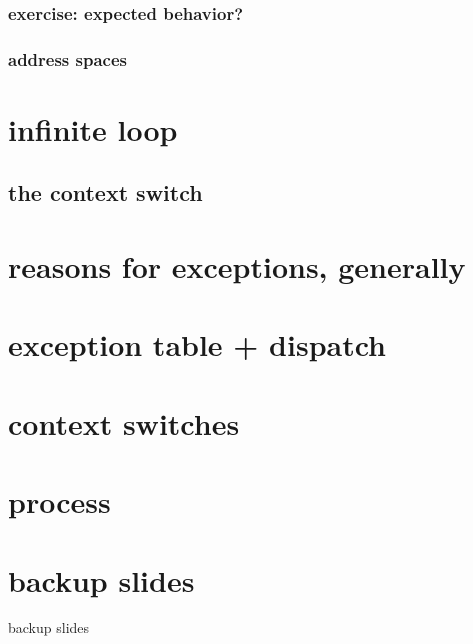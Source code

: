 \subsubsection{exercise: expected behavior?}


\subsubsection{address spaces}


\section{infinite loop}





\subsection{the context switch}



\section{reasons for exceptions, generally}

\section{exception table + dispatch}

\section{context switches}

\section{process}

\section{backup slides}
\begin{frame}{backup slides}
\end{frame}


